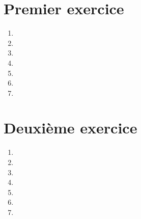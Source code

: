 \documentclass[a4paper,tp]{insa}
\begin{document}
	\maketitle
	\tableofcontents
	
	\section{Premier exercice}
	
	\begin{enumerate}
		\item \lipsum[1]
		\item \lipsum[1]
		\item \lipsum[1]
		\item \lipsum[1]
		\item \lipsum[1]
		\item \lipsum[1]
		\item \lipsum[1]
	\end{enumerate}
	
	\section{Deuxième exercice}
	
	\begin{enumerate}
		\item \lipsum[1]
		\item \lipsum[1]
		\item \lipsum[1]
		\item \lipsum[1]
		\item \lipsum[1]
		\item \lipsum[1]
		\item \lipsum[1]
	\end{enumerate}
\end{document}
